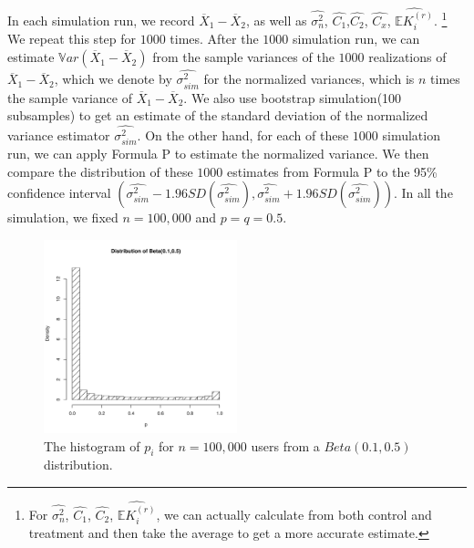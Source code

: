 \documentclass[11pt]{asaproc}
\newcommand{\wht}{\widehat}
\newcommand{\var}{\ensuremath{\mathbb Var}}
\newcommand{\bbe}{\mathbb{E}}
\newcommand{\xbar}{\overline{X}}
\newcommand{\naiveest}{\wht{\sigma^2_n}}
\begin{document}
In each simulation run, we record $\xbar_1-\xbar_2$, as well as  $\naiveest$, $\wht{C_1}$,$\wht{C_2}$, $\wht{C_x}$, $\wht{\bbe K_i^{(r)}}$. \footnote{For $\naiveest$, $\wht{C_1}$, $\wht{C_2}$, $\wht{\bbe K_i^{(r)}}$, we can actually calculate from both control and treatment and then take the average to get a more accurate estimate.} We repeat this step for $1000$ times. After the $1000$ simulation run, we can estimate $\var{(\xbar_1-\xbar_2)}$ from the sample variances of the $1000$ realizations of $\xbar_1-\xbar_2$, which we denote by $\wht{\sigma^2_{sim}}$ for the normalized variances, which is $n$ times the sample variance of $\xbar_1-\xbar_2$. We also use bootstrap simulation(100 subsamples) to get an estimate of the standard deviation of the normalized variance estimator $\wht{\sigma^2_{sim}}$. On the other hand, for each of these $1000$ simulation run, we can apply Formula P to estimate the normalized variance. We then compare the distribution of these $1000$ estimates from Formula P to the 95\% confidence interval $(\wht{\sigma^2_{sim}} - 1.96SD(\wht{\sigma^2_{sim}}), \wht{\sigma^2_{sim}} + 1.96SD(\wht{\sigma^2_{sim}}))$. In all the simulation, we fixed $n=100,000$ and $p=q = 0.5$.

\begin{figure}[!hbtp]
  \centering
  \includegraphics[width=0.5\textwidth]{beta-dist}
  \caption{The histogram of $p_i$ for $n=100,000$ users from a $Beta(0.1,0.5)$ distribution.}
  \label{fig:beta}
\end{figure}
\end{document}
